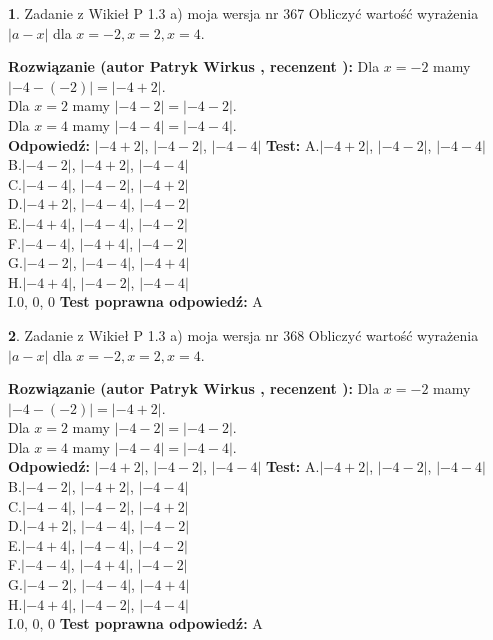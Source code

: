 \documentclass[12pt, a4paper]{article}
\theoremstyle{definition} %
\newtheorem{zad}{}
\newcommand{\zadStart}[1]{\begin{zad}#1\newline}
\newcommand{\zadStop}{\end{zad}}
\newcommand{\rozwStart}[2]{\noindent \textbf{Rozwiązanie (autor #1 , recenzent #2): }\newline}
\newcommand{\rozwStop}{\newline}
\newcommand{\odpStart}{\noindent \textbf{Odpowiedź:}\newline}
\newcommand{\odpStop}{\newline}
\newcommand{\testStart}{\noindent \textbf{Test:}\newline}
\newcommand{\testStop}{\newline}
\newcommand{\kluczStart}{\noindent \textbf{Test poprawna odpowiedź:}\newline}
\newcommand{\kluczStop}{\newline}
\begin{document}
\zadStart{Zadanie z Wikieł P 1.3 a) moja wersja nr 367}
Obliczyć wartość wyrażenia $|a - x|$ dla $x=-2,x=2,x=4$.
\zadStop
\rozwStart{Patryk Wirkus}{}
Dla $x = -2$ mamy $|-4 - (-2)| = |-4 + 2|$.\\
Dla $x = 2$ mamy $|-4 - 2| = |-4 - 2|$.\\
Dla $x = 4$ mamy $|-4 - 4| = |-4 - 4|$.\\
\rozwStop
\odpStart
$|-4 + 2|$, $|-4 - 2|$, $|-4 - 4|$
\odpStop
\testStart
A.$|-4 + 2|$, $|-4 - 2|$, $|-4 - 4|$\\
B.$|-4 - 2|$, $|-4 + 2|$, $|-4 - 4|$\\
C.$|-4 - 4|$, $|-4 - 2|$, $|-4 + 2|$\\
D.$|-4 + 2|$, $|-4 - 4|$, $|-4 - 2|$\\
E.$|-4 + 4|$, $|-4 - 4|$, $|-4 - 2|$\\
F.$|-4 - 4|$, $|-4 + 4|$, $|-4 - 2|$\\
G.$|-4 - 2|$, $|-4 - 4|$, $|-4 + 4|$\\
H.$|-4 + 4|$, $|-4 - 2|$, $|-4 - 4|$\\
I.$0$, $0$, $0$
\testStop
\kluczStart
A
\kluczStop



\zadStart{Zadanie z Wikieł P 1.3 a) moja wersja nr 368}
Obliczyć wartość wyrażenia $|a - x|$ dla $x=-2,x=2,x=4$.
\zadStop
\rozwStart{Patryk Wirkus}{}
Dla $x = -2$ mamy $|-4 - (-2)| = |-4 + 2|$.\\
Dla $x = 2$ mamy $|-4 - 2| = |-4 - 2|$.\\
Dla $x = 4$ mamy $|-4 - 4| = |-4 - 4|$.\\
\rozwStop
\odpStart
$|-4 + 2|$, $|-4 - 2|$, $|-4 - 4|$
\odpStop
\testStart
A.$|-4 + 2|$, $|-4 - 2|$, $|-4 - 4|$\\
B.$|-4 - 2|$, $|-4 + 2|$, $|-4 - 4|$\\
C.$|-4 - 4|$, $|-4 - 2|$, $|-4 + 2|$\\
D.$|-4 + 2|$, $|-4 - 4|$, $|-4 - 2|$\\
E.$|-4 + 4|$, $|-4 - 4|$, $|-4 - 2|$\\
F.$|-4 - 4|$, $|-4 + 4|$, $|-4 - 2|$\\
G.$|-4 - 2|$, $|-4 - 4|$, $|-4 + 4|$\\
H.$|-4 + 4|$, $|-4 - 2|$, $|-4 - 4|$\\
I.$0$, $0$, $0$
\testStop
\kluczStart
A
\kluczStop
\end{document}

